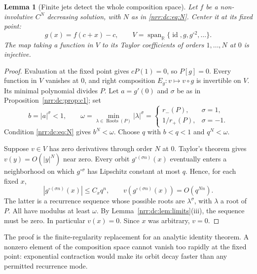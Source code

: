 \documentclass[11pt,letterpaper]{article}
\newtheorem{lemma}[theorem]{Lemma}
\theoremstyle{definition}
\theoremstyle{remark}
\newcommand{\R}{\mathbb R}
\newcommand{\id}{\operatorname{id}}
\newcommand{\roots}{\operatorname{Roots}}
\begin{document}
\begin{lemma}[Finite jets detect the whole composition space]
\label{nrr:dc:lem:jet}
Let $f$ be a non-involutive $C^N$ decreasing solution, with $N$ as in
\eqref{nrr:dc:eq:N}. Center it at its fixed point:
\[
 g(x)=f(c+x)-c,
 \qquad V=\operatorname{span}_{\R}\{\id,g,g^{\circ2},\ldots\}.
\]
The map taking a function in $V$ to its Taylor coefficients of orders
$1,\ldots,N$ at $0$ is injective.
\end{lemma}
\begin{proof}
Evaluation at the fixed point gives $cP(1)=0$, so $P[g]=0$.
Every function in $V$ vanishes at $0$, and right composition
$E_g\colon v\mapsto v\circ g$ is invertible on $V$. Its minimal polynomial
divides $P$. Let $a=g'(0)$ and $\sigma$ be as in
Proposition~\ref{nrr:dc:prop:c1}; set
\begin{equation}
 b=|a|^\sigma<1,
 \qquad \omega=\min_{\lambda\in\roots(P)}|\lambda|^\sigma
 =\begin{cases}r_-(P),&\sigma=1,\\1/r_+(P),&\sigma=-1.\end{cases}
 \label{nrr:dc:eq:kappa}
\end{equation}
Condition \eqref{nrr:dc:eq:N} gives $b^N<\omega$. Choose $q$ with
$b<q<1$ and $q^N<\omega$.

Suppose $v\in V$ has zero derivatives through order $N$ at $0$.
Taylor's theorem gives $v(y)=O(|y|^N)$ near zero. Every orbit
$g^{\circ(\sigma n)}(x)$ eventually enters a neighborhood on which
$g^{\circ\sigma}$ has Lipschitz constant at most $q$. Hence, for each
fixed $x$,
\[
 |g^{\circ(\sigma n)}(x)|\le C_xq^n,
 \qquad v(g^{\circ(\sigma n)}(x))=O(q^{Nn}).
\]
The latter is a recurrence sequence whose possible roots are
$\lambda^\sigma$, with $\lambda$ a root of $P$. All have modulus
at least $\omega$. By Lemma~\ref{nrr:dc:lem:limits}(iii), the sequence must
be zero. In particular $v(x)=0$. Since $x$ was arbitrary, $v=0$.
\end{proof}

The proof is the finite-regularity replacement for an analytic identity
theorem. A nonzero element of the composition space cannot vanish too
rapidly at the fixed point: exponential contraction would make its
orbit decay faster than any permitted recurrence mode.
\end{document}

